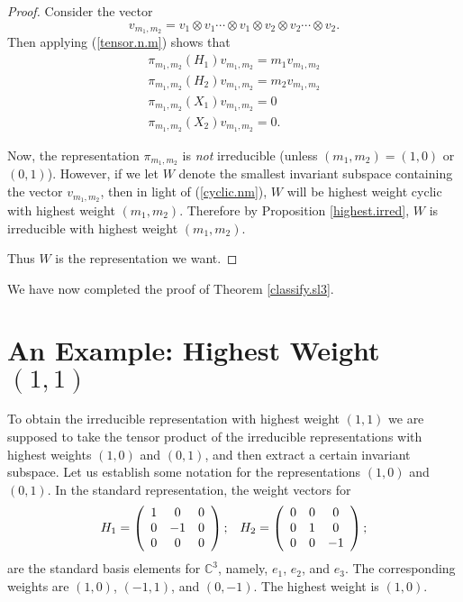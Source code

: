 \documentclass{amsbook}
\theoremstyle{plain}
\numberwithin{equation}{chapter}
\numberwithin{theorem}{chapter}
\begin{document}
\begin{proof}
Consider the vector
\[
v_{m_{1},m_{2}}=v_{1}\otimes v_{1}\cdots\otimes v_{1}\otimes v_{2}\otimes
v_{2}\cdots\otimes v_{2}\text{.}%
\]
Then applying (\ref{tensor.n.m}) shows that
\begin{align}
\pi_{m_{1},m_{2}}(H_{1})v_{m_{1},m_{2}}=m_{1}v_{m_{1},m_{2}}\nonumber\\
\pi_{m_{1},m_{2}}(H_{2})v_{m_{1},m_{2}}=m_{2}v_{m_{1},m_{2}}\nonumber\\
\pi_{m_{1},m_{2}}(X_{1})v_{m_{1},m_{2}}=0\nonumber\\
\pi_{m_{1},m_{2}}(X_{2})v_{m_{1},m_{2}}=0\text{.}\label{cyclic.nm}%
\end{align}

Now, the representation $\pi_{m_{1},m_{2}}$ is \textit{not} irreducible
(unless $(m_{1},m_{2})=\left(  1,0\right)  $ or $\left(  0,1\right)  $).
However, if we let $W$ denote the smallest invariant subspace containing the
vector $v_{m_{1},m_{2}}$, then in light of (\ref{cyclic.nm}), $W$ will be
highest weight cyclic with highest weight $(m_{1},m_{2})$. Therefore by
Proposition \ref{highest.irred}, $W$ is irreducible with highest weight
$(m_{1},m_{2})$.

Thus $W$ is the representation we want.
\end{proof}

We have now completed the proof of Theorem \ref{classify.sl3}.

\section{An Example: Highest Weight $\left(  1,1\right)  $}

To obtain the irreducible representation with highest weight $\left(
1,1\right)  $ we are supposed to take the tensor product of the irreducible
representations with highest weights $\left(  1,0\right)  $ and $\left(
0,1\right)  $, and then extract a certain invariant subspace. Let us establish
some notation for the representations $\left(  1,0\right)  $ and $\left(
0,1\right)  $. In the standard representation, the weight vectors for
\[%
\begin{array}
[c]{cc}%
H_{1}=\left(
\begin{array}
[c]{ccc}%
1 & 0 & 0\\
0 & -1 & 0\\
0 & 0 & 0
\end{array}
\right)  ; & H_{2}=\left(
\begin{array}
[c]{ccc}%
0 & 0 & 0\\
0 & 1 & 0\\
0 & 0 & -1
\end{array}
\right)  ;
\end{array}
\]
are the standard basis elements for $\mathbb{C}^{3}$, namely, $e_{1}$, $e_{2}%
$, and $e_{3}$. The corresponding weights are $\left(  1,0\right)  $, $\left(
-1,1\right)  $, and $\left(  0,-1\right)  $. The highest weight is $\left(
1,0\right)  $.
\end{document}
